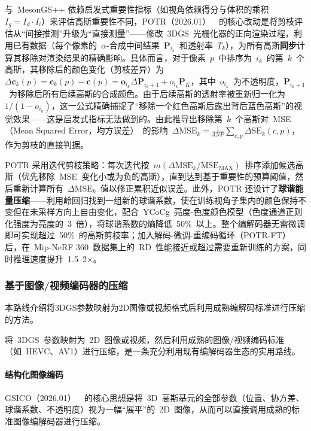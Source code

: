 与~MesonGS++ 依赖启发式重要性指标（如视角依赖得分与体积的乘积~$I_g = I_d \cdot I_i$）来评估高斯重要性不同，POTR（2026.01）~\cite{2601_14821}~的核心改动是将剪枝评估从``间接推测''升级为``直接测量''——修改~3DGS~光栅化器的正向渲染过程，利用已有数据（每个像素的~$\alpha$-合成中间结果~$\mathbf{P}_{i_k}$~和透射率~$T_k$），为所有高斯\textbf{同步}计算其移除对渲染结果的精确影响。具体而言，对于像素~$p$~中排序为~$i_k$~的第~$k$~个高斯，其移除后的颜色变化（剪枝差异）为~$\Delta \mathbf{c}_k(p) = \mathbf{c}_k(p) - \mathbf{c}(p) = \mathbf{o}_{i_k} \Delta \mathbf{P}_{i_k+1} + o_{i_k} \mathbf{P}_K$，其中~$o_{i_k}$~为不透明度，$\mathbf{P}_{i_k+1}$~为移除后所有后续高斯的合成颜色。由于后续高斯的透射率被重新归一化为~$1/(1 - o_{i_k})$，这一公式精确捕捉了``移除一个红色高斯后露出背后蓝色高斯''的视觉效果——这是启发式指标无法做到的。由此推导出移除第~$k$~个高斯对~MSE（Mean Squared Error，均方误差）~的影响~$\Delta \text{MSE}_k = \frac{1}{3NP} \sum_{c,p} \Delta \text{SE}_k(c,p)$，作为剪枝的直接判据。

POTR 采用迭代剪枝策略：每次迭代按~$m(\Delta \text{MSE}_k / \text{MSE}_\text{MAX})$~排序添加候选高斯（优先移除~MSE~变化小或为负的高斯），直到达到基于重要性的预算阈值，然后重新计算所有~$\Delta \text{MSE}_k$~值以修正累积近似误差。此外，POTR 还设计了\textbf{球谐能量压缩}——利用岭回归找到一组新的球谐系数，使在训练视角子集内的颜色保持不变但在未采样方向上自由变化，配合~YCoCg~亮度-色度颜色模型（色度通道正则化强度为亮度的~3~倍），将球谐系数的熵降低~50\%~以上。整个编解码器无需微调即可实现超过~50\%~的高斯剪枝率；加入解码-微调-重编码循环（POTR-FT）后，在~Mip-NeRF 360~数据集上的~RD~性能接近或超过需要重新训练的方案，同时推理速度提升~1.5--2$\times$。

\subsubsection{基于图像/视频编码器的压缩}

本路线介绍将3DGS参数映射为2D图像或视频格式后利用成熟编解码标准进行压缩的方法。

将~3DGS~参数映射为~2D~图像或视频，然后利用成熟的图像/视频编码标准（如~HEVC、AV1）进行压缩，是一条充分利用现有编解码器生态的实用路线。

\paragraph{结构化图像编码}

GSICO（2026.01）~\cite{2601_14510}~的核心思想是将~3D~高斯基元的全部参数（位置、协方差、球谐系数、不透明度）视为一幅``展平''的~2D~图像，从而可以直接调用成熟的标准图像编解码器进行压缩。

